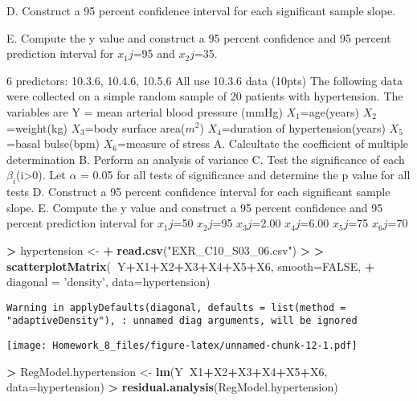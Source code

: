 \documentclass[]{article}
\newenvironment{Shaded}{\begin{snugshade}}{\end{snugshade}}
\newcommand{\KeywordTok}[1]{\textcolor[rgb]{0.13,0.29,0.53}{\textbf{#1}}}
\newcommand{\DataTypeTok}[1]{\textcolor[rgb]{0.13,0.29,0.53}{#1}}
\newcommand{\StringTok}[1]{\textcolor[rgb]{0.31,0.60,0.02}{#1}}
\newcommand{\OtherTok}[1]{\textcolor[rgb]{0.56,0.35,0.01}{#1}}
\newcommand{\OperatorTok}[1]{\textcolor[rgb]{0.81,0.36,0.00}{\textbf{#1}}}
\newcommand{\ErrorTok}[1]{\textcolor[rgb]{0.64,0.00,0.00}{\textbf{#1}}}
\newcommand{\NormalTok}[1]{#1}
\begin{document}
D. Construct a 95 percent confidence interval for each significant
sample slope.

E. Compute the y value and construct a 95 percent confidence and 95
percent prediction interval for \(x_1j\)=95 and \(x_2j\)=35.

6 predictors: 10.3.6, 10.4.6, 10.5.6 All use 10.3.6 data (10pts) The
following data were collected on a simple random sample of 20 patients
with hypertension. The variables are Y = mean arterial blood pressure
(mmHg) \(X_1\)=age(years) \(X_2\)=weight(kg) \(X_3\)=body surface
area(\(m^2\)) \(X_4\)=duration of hypertension(years) \(X_5\)=basal
bulse(bpm) \(X_6\)=measure of stress A. Calcultate the coefficient of
multiple determination B. Perform an analysis of variance C. Test the
significance of each \(\beta_i\)(i\textgreater{}0). Let \(\alpha\) =
0.05 for all tests of significance and determine the p value for all
tests D. Construct a 95 percent confidence interval for each significant
sample slope. E. Compute the y value and construct a 95 percent
confidence and 95 percent prediction interval for \(x_1j\)=50
\(x_2j\)=95 \(x_3j\)=2.00 \(x_4j\)=6.00 \(x_5j\)=75 \(x_6j\)=70

\begin{Shaded}
\begin{Highlighting}[]
\OperatorTok{>}\StringTok{ }\NormalTok{hypertension <-}\StringTok{ }
\OperatorTok{+}\StringTok{   }\KeywordTok{read.csv}\NormalTok{(}\StringTok{"EXR_C10_S03_06.csv"}\NormalTok{)}
\OperatorTok{>}\StringTok{ }
\ErrorTok{>}\StringTok{ }\KeywordTok{scatterplotMatrix}\NormalTok{(}\OperatorTok{~}\NormalTok{Y}\OperatorTok{+}\NormalTok{X1}\OperatorTok{+}\NormalTok{X2}\OperatorTok{+}\NormalTok{X3}\OperatorTok{+}\NormalTok{X4}\OperatorTok{+}\NormalTok{X5}\OperatorTok{+}\NormalTok{X6, }\DataTypeTok{smooth=}\OtherTok{FALSE}\NormalTok{, }
\OperatorTok{+}\StringTok{   }\DataTypeTok{diagonal =} \StringTok{'density'}\NormalTok{, }\DataTypeTok{data=}\NormalTok{hypertension)}
\end{Highlighting}
\end{Shaded}

\begin{verbatim}
Warning in applyDefaults(diagonal, defaults = list(method =
"adaptiveDensity"), : unnamed diag arguments, will be ignored
\end{verbatim}

\texttt{[image: Homework\_8\_files/figure-latex/unnamed-chunk-12-1.pdf]}

\begin{Shaded}
\begin{Highlighting}[]
\OperatorTok{>}\StringTok{ }\NormalTok{RegModel.hypertension <-}\StringTok{ }\KeywordTok{lm}\NormalTok{(Y}\OperatorTok{~}\NormalTok{X1}\OperatorTok{+}\NormalTok{X2}\OperatorTok{+}\NormalTok{X3}\OperatorTok{+}\NormalTok{X4}\OperatorTok{+}\NormalTok{X5}\OperatorTok{+}\NormalTok{X6, }\DataTypeTok{data=}\NormalTok{hypertension)}
\OperatorTok{>}\StringTok{ }\KeywordTok{residual.analysis}\NormalTok{(RegModel.hypertension)}
\end{Highlighting}
\end{Shaded}
\end{document}
